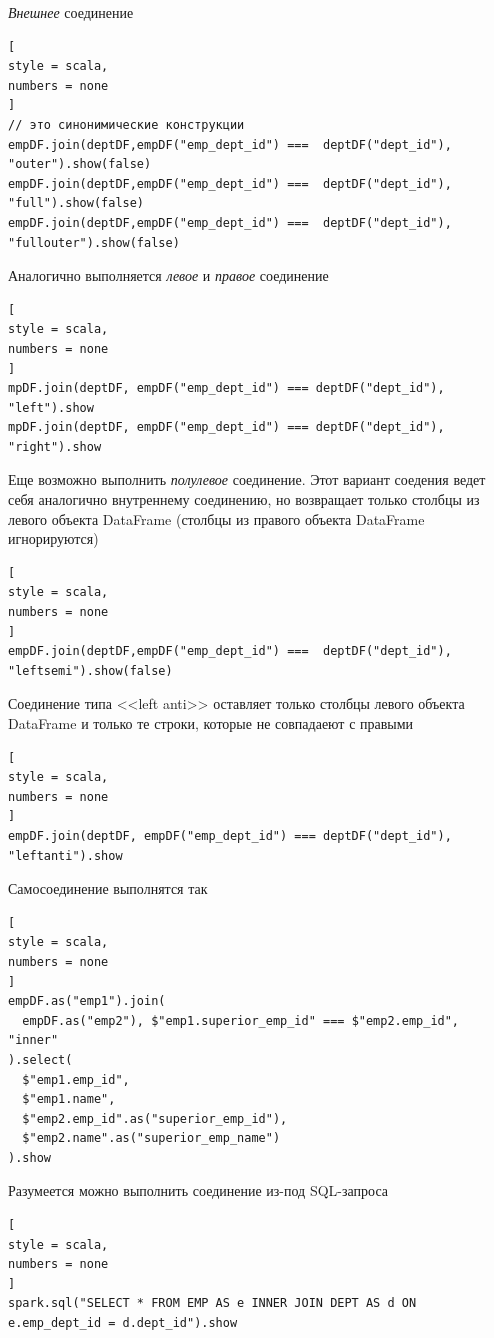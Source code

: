 \documentclass[%
	11pt,
	a4paper,
	utf8,
		]{article}
\begin{document}
\emph{Внешнее} соединение
\begin{lstlisting}[
style = scala,
numbers = none	
]
// это синонимические конструкции
empDF.join(deptDF,empDF("emp_dept_id") ===  deptDF("dept_id"), "outer").show(false)
empDF.join(deptDF,empDF("emp_dept_id") ===  deptDF("dept_id"), "full").show(false)
empDF.join(deptDF,empDF("emp_dept_id") ===  deptDF("dept_id"), "fullouter").show(false)
\end{lstlisting}

Аналогично выполняется \emph{левое} и \emph{правое} соединение
\begin{lstlisting}[
style = scala,
numbers = none	
]
mpDF.join(deptDF, empDF("emp_dept_id") === deptDF("dept_id"), "left").show
mpDF.join(deptDF, empDF("emp_dept_id") === deptDF("dept_id"), "right").show
\end{lstlisting}

Еще возможно выполнить \emph{полулевое} соединение. Этот вариант соедения ведет себя аналогично внутреннему соединению, но возвращает только столбцы из левого объекта DataFrame (столбцы из правого объекта DataFrame игнорируются)
\begin{lstlisting}[
style = scala,
numbers = none	
]
empDF.join(deptDF,empDF("emp_dept_id") ===  deptDF("dept_id"), "leftsemi").show(false)
\end{lstlisting}

Соединение типа <<left anti>> оставляет только столбцы левого объекта DataFrame и только те строки, которые не совпадаеют с правыми
\begin{lstlisting}[
style = scala,
numbers = none	
]
empDF.join(deptDF, empDF("emp_dept_id") === deptDF("dept_id"), "leftanti").show
\end{lstlisting}

Самосоединение выполнятся так
\begin{lstlisting}[
style = scala,
numbers = none	
]
empDF.as("emp1").join(
  empDF.as("emp2"), $"emp1.superior_emp_id" === $"emp2.emp_id", "inner"
).select(
  $"emp1.emp_id",
  $"emp1.name",
  $"emp2.emp_id".as("superior_emp_id"),
  $"emp2.name".as("superior_emp_name")
).show
\end{lstlisting}

Разумеется можно выполнить соединение из-под SQL-запроса
\begin{lstlisting}[
style = scala,
numbers = none	
]
spark.sql("SELECT * FROM EMP AS e INNER JOIN DEPT AS d ON e.emp_dept_id = d.dept_id").show
\end{lstlisting}
\end{document}
